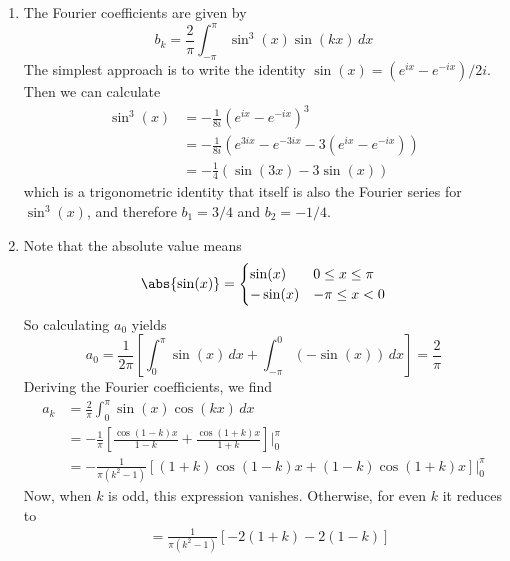 \documentclass[a4paper]{article}
\begin{document}
\begin{enumerate}[label=(\alph*)]
	\item The Fourier coefficients are given by
	\[
		b_{k} = \frac{2}{\pi} \int^{\pi}_{-\pi} \sin^{3}\!\left(x\right) \sin\!\left(kx\right) \, dx  
	\]
	The simplest approach is to write the identity \( \sin\!\left(x\right) = \!\left( e^{ix} - e^{-ix} \right) / 2i \). Then we can calculate
	\begin{align*}
		\sin^{3}\!\left(x\right) & = -\frac{1}{8i} \!\left( e^{ix} - e^{-ix} \right)^{3} \\
	                                 & = -\frac{1}{8i} \!\left( e^{3ix} - e^{-3ix} - 3 \!\left( e^{ix} - e^{-ix} \right) \right) \\ 
					 & = -\frac{1}{4} \!\left( \sin\!\left(3x\right) - 3 \sin\!\left(x\right) \right)
	\end{align*}
	which is a trigonometric identity that itself is also the Fourier series for \( \sin^{3}\!\left(x\right) \), and therefore \( b_{1} = 3/4 \) and \( b_{2} = -1/4 \).
	\item Note that the absolute value means
	\[
		\abs{\sin\!\left(x\right)} = \begin{cases}
			\sin\!\left(x\right) & 0 \le x \le \pi \\
			-\sin\!\left(x\right) & -\pi \le x < 0 \\
		\end{cases} 
	\]
	So calculating \( a_{0} \) yields
	\[
		a_{0} = \frac{1}{2 \pi} \!\left[ \int^{\pi}_{0} \sin\!\left(x\right) \, dx + \int^{0}_{-\pi} \!\left( -\sin\!\left(x\right) \right) \, dx \right] = \frac{2}{\pi}
	\]
	Deriving the Fourier coefficients, we find
	\begin{align*}
		a_{k} & = \frac{2}{\pi} \int^{\pi}_{0} \sin\!\left(x\right) \cos\!\left(kx\right) \, dx \\
		 & = -\frac{1}{\pi} \!\left[ \frac{\cos\!\left(1 - k\right) x}{1 - k} + \frac{\cos\!\left(1 + k\right) x}{1 + k} \right] \Big|^{\pi}_{0} \\
		 & = -\frac{1}{\pi \!\left( k^{2} - 1 \right)} \!\left[ \!\left( 1 + k \right)\cos\!\left(1 - k\right)x + \!\left( 1 - k \right)\cos\!\left(1 + k\right)x \right] \Big|^{\pi}_{0} 
	\end{align*}
	Now, when \( k \) is odd, this expression vanishes. Otherwise, for even \( k \) it reduces to
	\begin{align*}
		 & = \frac{1}{\pi \!\left( k^{2} - 1 \right)} \!\left[ -2 \!\left( 1 + k \right) - 2 \!\left( 1 - k \right) \right] \\

\end{align*}
\end{enumerate}
\end{document}
